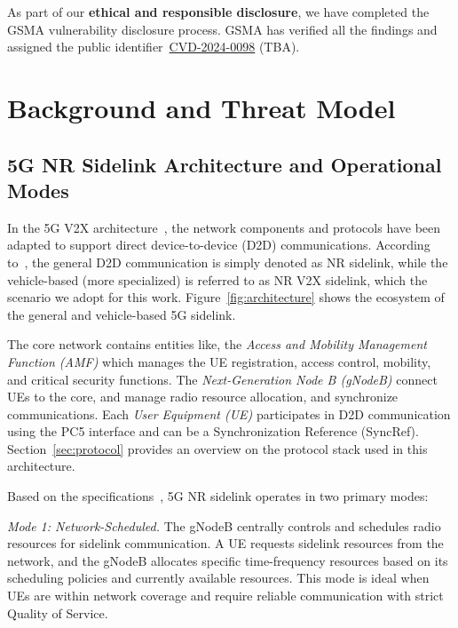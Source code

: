 As part of our \textbf{ethical and responsible disclosure}, we have completed the GSMA vulnerability disclosure process. GSMA has verified all the findings and assigned the public identifier~\href{https://www.gsma.com/solutions-and-impact/technologies/security/gsma-mobile-security-research-acknowledgements/}{CVD-2024-0098} (TBA).


\section{Background and Threat Model} \label{sec:prelims}

\subsection{5G NR Sidelink Architecture and Operational Modes}

In the 5G V2X architecture~\cite{3gpp.23.287, 3gpp.38.331}, the network components and protocols have been adapted to support direct device-to-device (D2D) communications. According to~\cite{3gpp.38.331}, the general D2D communication is simply denoted as NR sidelink, while the vehicle-based (more specialized) is referred to as NR V2X sidelink, which the scenario we adopt for this work. Figure~\ref{fig:architecture} shows the ecosystem of the general and vehicle-based 5G sidelink. 

The core network contains entities like, the \textit{Access and Mobility Management Function (AMF)} which manages the UE registration, access control, mobility, and critical security functions. The \textit{Next-Generation Node B (gNodeB)} connect UEs to the core, and manage radio resource allocation, and synchronize communications. Each \textit{User Equipment (UE)} participates in D2D communication using the PC5 interface and can be a Synchronization Reference (SyncRef). Section~\ref{sec:protocol} provides an overview on the protocol stack used in this architecture.

Based on the specifications~\cite{3gpp.37.985, 3gpp.38.300}, 5G NR sidelink operates in two primary modes: 

\emph{Mode 1: Network-Scheduled.} The gNodeB centrally controls and schedules radio resources for sidelink communication. A UE requests sidelink resources from the network, and the gNodeB allocates specific time-frequency resources based on its scheduling policies and currently available resources. This mode is ideal when UEs are within network coverage and require reliable communication with strict Quality of Service. 

